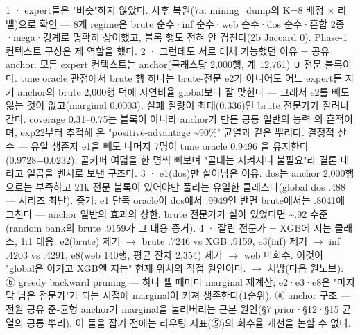 1 · expert들은 "비슷"하지 않았다. 사후 복원(7a: mining\_\allowbreak{}dump의 K=\allowbreak{}8 배정 × 라벨)으로 확인 — 8개 regime은 brute 순수·inf 순수·web 순수·dos 순수·혼합 2종·mega·경계로 명확히 상이했고, 블록 행도 전혀 안 겹친다(2b Jaccard 0). Phase-1 컨텍스트 구성은 제 역할을 했다. 2 · 그런데도 서로 대체 가능했던 이유 =\allowbreak{} 공유 anchor. 모든 expert 컨텍스트는 anchor(클래스당 2,000행, 계 12,761) ∪ 전문 블록이다. tune oracle 관점에서 brute 행 하나는 brute-전문 e2가 아니어도 어느 expert든 자기 anchor의 brute 2,000행 덕에 자연비율 global보다 잘 맞힌다 — 그래서 e2를 빼도 잃는 것이 없고(marginal 0.0003), 실패 질량이 최대(0.336)인 brute 전문가가 잘려나간다. coverage 0.31–0.75는 블록이 아니라 anchor가 만든 공통 일반의 능력 의 흔적이며, exp22부터 추적해 온 "positive-advantage \textasciitilde{}90\%" 균열과 같은 뿌리다. 결정적 산수 — 유일 생존자 e1을 빼도 나머지 7명이 tune oracle 0.9496 을 유지한다(0.9728−0.0232): 골키퍼 여덟을 한 명씩 빼보며 "골대는 지켜지니 불필요"라 결론 내리고 일곱을 벤치로 보낸 구조다. 3 · e1(dos)만 살아남은 이유. dos는 anchor 2,000행으로는 부족하고 21k 전문 블록이 있어야만 풀리는 유일한 클래스다(global dos .488 — 시리즈 최난). 증거: e1 단독 oracle이 dos에서 .9949인 반면 brute에서는 .8041에 그친다 — anchor 일반의 효과의 상한. brute 전문가가 살아 있었다면 \textasciitilde{}.92 수준(random bank의 brute .9159가 그 대용 증거). 4 · 잘린 전문가 =\allowbreak{} XGB에 지는 클래스, 1:1 대응. e2(brute) 제거  \ensuremath{\rightarrow}  brute .7246 vs XGB .9159, e3(inf) 제거  \ensuremath{\rightarrow}  inf .4203 vs .4291, e8(web 140행, 평균 잔차 2,354) 제거  \ensuremath{\rightarrow}  web 미회수. 이것이 "global은 이기고 XGB엔 지는" 현재 위치의 직접 원인이다.  \ensuremath{\rightarrow}  처방(다음 원노브): ⓑ greedy backward pruning — 하나 뺄 때마다 marginal 재계산; e2·e3·e8은 "마지막 남은 전문가"가 되는 시점에 marginal이 커져 생존한다(1순위). ⓐ anchor 구조 — 전원 공유 준-균형 anchor가 marginal을 눌러버리는 근본 원인(§7 prior·§12·§15 균열의 공통 뿌리). 이 둘을 잡기 전에는 라우팅 지표(⑤)의 회수율 개선을 논할 수 없다.

